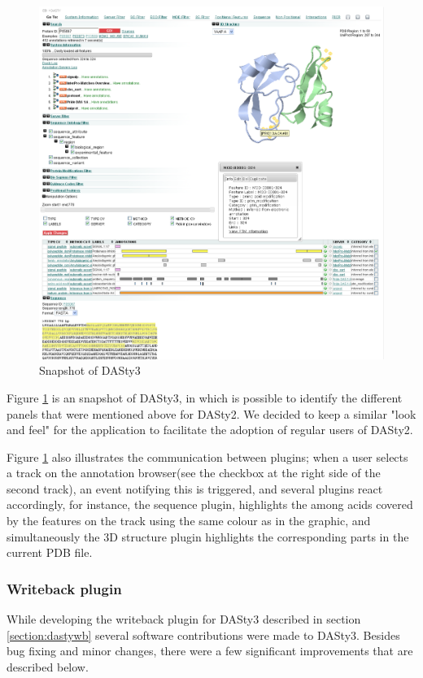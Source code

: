 \begin{figure}
\centering
\includegraphics[width=\textwidth]{figures/dasty3.png} 
\caption{Snapshot of DASty3}  \label{fig:dasty3}
\end{figure}


Figure \ref{fig:dasty3} is an snapshot of DASty3, in which is possible to identify the different panels that were mentioned above for DASty2. We decided to keep a similar "look and feel" for the application to facilitate the adoption of regular users of DASty2. 

Figure \ref{fig:dasty3} also illustrates the communication between plugins; when a user selects a track on the annotation browser(see the checkbox at the right side of the second track), an event notifying this is triggered, and several plugins react accordingly, for instance, the sequence plugin, highlights the among acids covered by the features on the track using the same colour as in the graphic, and simultaneously the 3D structure plugin highlights the corresponding parts in the current PDB file.
\subsubsection{Writeback plugin}
While developing the writeback plugin for DASty3 described in section \ref{section:dastywb} several software contributions were made to DASty3. Besides bug fixing and minor changes, there were a few significant improvements that are described below.

